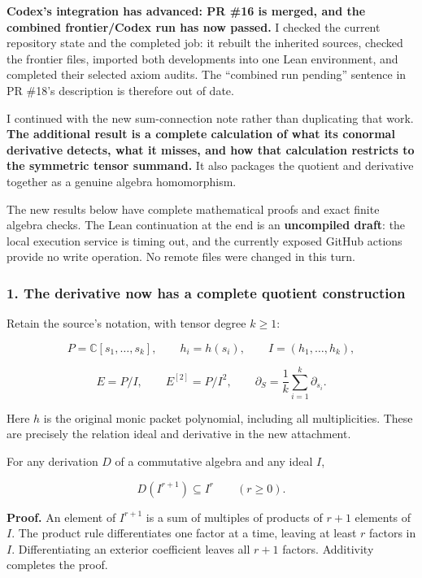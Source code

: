 \textbf{Codex's integration has advanced: PR \#16 is merged, and the combined frontier/Codex run has
now passed.} I checked the current repository state and the completed job: it rebuilt the inherited
sources, checked the frontier files, imported both developments into one Lean environment, and
completed their selected axiom audits. The ``combined run pending'' sentence in PR \#18's
description is therefore out of date.

I continued with the new sum-connection note rather than duplicating that work. \textbf{The
additional result is a complete calculation of what its conormal derivative detects, what it misses,
and how that calculation restricts to the symmetric tensor summand.} It also packages the quotient
and derivative together as a genuine algebra homomorphism.

The new results below have complete mathematical proofs and exact finite algebra checks. The Lean
continuation at the end is an \textbf{uncompiled draft}: the local execution service is timing out,
and the currently exposed GitHub actions provide no write operation. No remote files were changed in
this turn.

\subsubsection{1. The derivative now has a complete quotient
construction}\label{conormal_tower_pasted:the-derivative-now-has-a-complete-quotient-construction}

Retain the source's notation, with tensor degree \(k\ge1\):

\[
P=\mathbb C[s_1,\ldots,s_k],\qquad
h_i=h(s_i),\qquad
I=(h_1,\ldots,h_k),
\]

\[
E=P/I,\qquad E^{[2]}=P/I^2,
\qquad
\partial_S=\frac1k\sum_{i=1}^k\partial_{s_i}.
\]

Here \(h\) is the original monic packet polynomial, including all multiplicities. These are
precisely the relation ideal and derivative in the new attachment.

For any derivation \(D\) of a commutative algebra and any ideal \(I\),

\[
\boxed{D(I^{r+1})\subseteq I^r\qquad(r\ge0).}
\]

\textbf{Proof.} An element of \(I^{r+1}\) is a sum of multiples of products of \(r+1\) elements of
\(I\). The product rule differentiates one factor at a time, leaving at least \(r\) factors in
\(I\). Differentiating an exterior coefficient leaves all \(r+1\) factors. Additivity completes the
proof.

